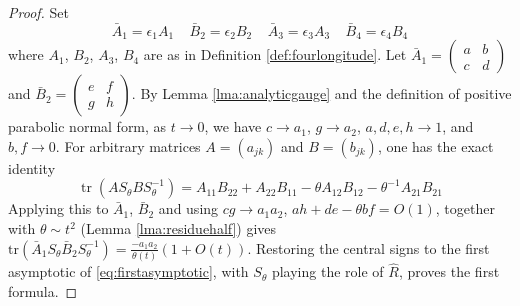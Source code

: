 \documentclass{article}
\DeclareMathOperator{\tr}{tr}
\theoremstyle{plain}
\theoremstyle{definition}
\theoremstyle{plain}
\theoremstyle{plain}
\theoremstyle{plain}
\theoremstyle{remark}
\theoremstyle{remark}
\theoremstyle{plain}
\theoremstyle{plain}
\theoremstyle{plain}
\theoremstyle{plain}
\begin{document}
\begin{proof}
Set
\begin{equation*}
	\bar A_1 = \epsilon_1A_1 \ \ \ \ \ \bar B_2 = \epsilon_2B_2 \ \ \ \ \ \bar A_3 = \epsilon_3A_3 \ \ \ \ \ \bar B_4 = \epsilon_4B_4
\end{equation*}
where $A_1$, $B_2$, $A_3$, $B_4$ are as in Definition \ref{def:fourlongitude}. Let $\bar A_1 = \left(\begin{smallmatrix}a&b\\c&d\end{smallmatrix}\right)$ and $\bar B_2 = \left(\begin{smallmatrix}e&f\\g&h\end{smallmatrix}\right)$. By Lemma \ref{lma:analyticgauge} and the definition of positive parabolic normal form, as $t \to 0$, we have $c \to a_1$, $g \to a_2$, $a, d, e, h \to 1$, and $b, f \to 0$. For arbitrary matrices $A = (a_{jk})$ and $B = (b_{jk})$, one has the exact identity 
\begin{equation}\label{eq:twofactor}
	\tr(AS_\theta BS_\theta^{-1}) = A_{11}B_{22} + A_{22}B_{11} - \theta A_{12}B_{12} - \theta^{-1}A_{21}B_{21}
\end{equation}
Applying this to $\bar A_1$, $\bar B_2$ and using $cg \to a_1a_2$, $ah + de - \theta bf = O(1)$, together with $\theta \sim t^2$ (Lemma \ref{lma:residuehalf}) gives $\mathrm{tr}(\bar A_1S_\theta\bar B_2S_\theta^{-1}) = \frac{-a_1a_2}{\theta(t)}(1 + O(t))$. Restoring the central signs to the first asymptotic of \eqref{eq:firstasymptotic}, with $S_\theta$ playing the role of $\widehat R$, proves the first formula. 

\medskip


\end{proof}
\end{document}
